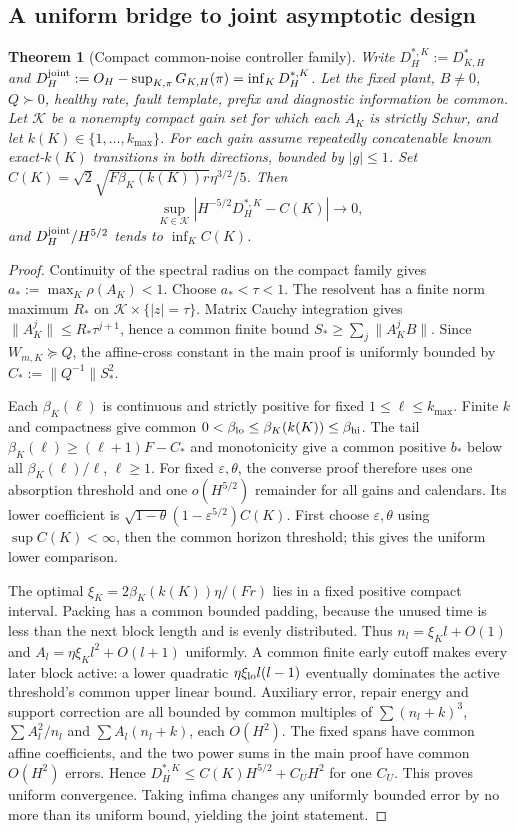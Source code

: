 \documentclass[11pt]{article}
\newtheorem{theorem}{Theorem}
\begin{document}
\subsection{A uniform bridge to joint asymptotic design}
\begin{theorem}[Compact common-noise controller family]\label{thm:uniform}
Write $D_H^{*,K}:=D_{K,H}^*$ and
$D_H^{\rm joint}:=O_H-\sup_{K,\pi}G_{K,H}(\pi)=\inf_KD_H^{*,K}$.
Let the fixed plant, $B\ne0$, $Q\succ0$, healthy rate, fault template,
prefix and diagnostic information be common. Let $\mathcal K$ be a nonempty
compact gain set for which each $A_K$ is strictly Schur, and let
$k(K)\in\{1,\ldots,k_{\max}\}$. For each gain assume repeatedly concatenable
known exact-$k(K)$ transitions in both directions, bounded by $|g|\le1$.
Set $C(K)=\sqrt2\sqrt{F\beta_K(k(K))r}\eta^{3/2}/5$. Then
\[
\sup_{K\in\mathcal K}|H^{-5/2}D_H^{*,K}-C(K)|\longrightarrow0,
\]
and $D_H^{\rm joint}/H^{5/2}$ tends to $\inf_K C(K)$.
\end{theorem}
\begin{proof}
Continuity of the spectral radius on the compact family gives
$a_*:=\max_K\rho(A_K)<1$. Choose $a_*<\tau<1$.
The resolvent has a finite norm maximum $R_*$ on
$\mathcal K\times\{|z|=\tau\}$. Matrix Cauchy integration gives
$\|A_K^j\|\le R_*\tau^{j+1}$, hence a common finite bound
$S_*\ge\sum_j\|A_K^jB\|$.
Since $W_{m,K}\succeq Q$, the affine-cross constant in the main proof is
uniformly bounded by $C_*:=\|Q^{-1}\|S_*^2$.

Each $\beta_K(\ell)$ is continuous and strictly positive for fixed
$1\le\ell\le k_{\max}$. Finite $k$ and compactness give common
$0<\beta_{\rm lo}\le\beta_K(k(K))\le\beta_{\rm hi}$.
The tail $\beta_K(\ell)\ge(\ell+1)F-C_*$ and monotonicity give
a common positive $b_*$ below all $\beta_K(\ell)/\ell$, $\ell\ge1$.
For fixed $\varepsilon,\theta$, the converse proof therefore uses one
absorption threshold and one $o(H^{5/2})$ remainder for all gains and calendars.
Its lower coefficient is
$\sqrt{1-\theta}(1-\varepsilon^{5/2})C(K)$.
First choose $\varepsilon,\theta$ using $\sup C(K)<\infty$, then the common
horizon threshold; this gives the uniform lower comparison.

The optimal $\xi_K=2\beta_K(k(K))\eta/(Fr)$ lies in a fixed positive compact
interval. Packing has a common bounded padding, because the unused time is
less than the next block length and is evenly distributed.
Thus $n_l=\xi_Kl+O(1)$ and $A_l=\eta\xi_Kl^2+O(l+1)$ uniformly.
A common finite early cutoff makes every later block active: a lower quadratic
$\eta\xi_{\rm lo}l(l-1)$ eventually dominates the active threshold's common
upper linear bound. Auxiliary error, repair energy and support correction
are all bounded by common multiples of
$\sum(n_l+k)^3$, $\sum A_l^2/n_l$ and $\sum A_l(n_l+k)$, each $O(H^2)$.
The fixed spans have common affine coefficients, and the two power sums in
the main proof have common $O(H^2)$ errors. Hence
$D_H^{*,K}\le C(K)H^{5/2}+C_UH^2$ for one $C_U$.
This proves uniform convergence. Taking infima changes any uniformly bounded
error by no more than its uniform bound, yielding the joint statement.
\end{proof}
\end{document}

